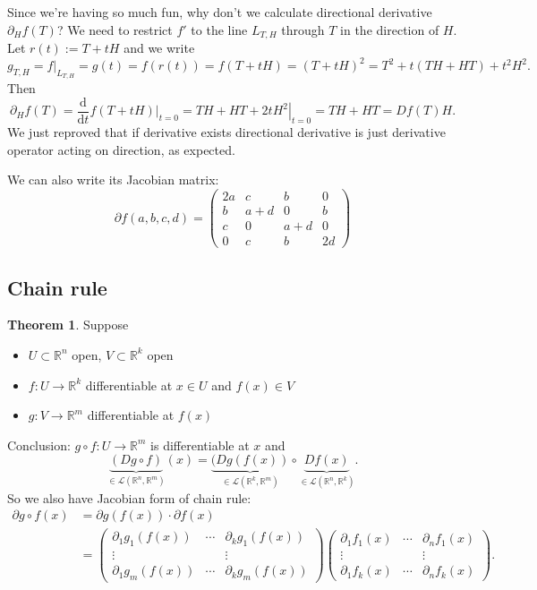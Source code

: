 \documentclass[a4paper]{article}
\theoremstyle{definition}
\newtheorem{thm}[defn]{Theorem}
\begin{document}
Since we're having so much fun, why don't we calculate directional derivative $\partial_H f(T)$? We need to restrict $f'$ to the line $L_{T,H}$ through $T$ in the direction of $H$. Let $r(t):=T+tH$ and we write
\[
g_{T,H} = \left. f \right|_{L_{T,H}} = g(t) = f(r(t)) = f(T+tH) = (T+tH)^2 = T^2+t(TH+HT)+t^2H^2 .
\]
Then
\[
\partial _H f(T) = \frac{\mathrm d}{\mathrm d t} \left. f(T+tH) \right|_{t=0} = \left. TH+HT+2tH^2 \right|_{t=0} = TH+HT = Df(T)H.
\]
We just reproved that if derivative exists directional derivative is just derivative operator acting on direction, as expected.

We can also write its Jacobian matrix:
\[
\partial f (a,b,c,d)=\begin{pmatrix}
2a & c & b & 0\\
b & a+d & 0 & b\\
c & 0 & a+d & 0\\
0 & c & b & 2d
\end{pmatrix}
\]

\subsection{Chain rule}
\begin{thm}
Suppose \begin{itemize}
    \item $U \subset \mathbb R^n$ open, $V\subset \mathbb R^k$ open
    \item $f:U\rightarrow \mathbb R^k$ differentiable at $x\in U$ and $f(x)\in V$
    \item $g:V\rightarrow \mathbb R^m$ differentiable at $f(x)$
\end{itemize}
Conclusion: $g\circ f:U\rightarrow \mathbb R^m$ is differentiable at $x$ and
\[
\underbrace{(D g\circ f)}_{\in \mathcal L(\mathbb R^n, \mathbb R^m)}(x) = \underbrace{(Dg(f(x))}_{\in \mathcal L(\mathbb R^k, \mathbb R^m)} \circ \underbrace{Df(x)}_{\in \mathcal L(\mathbb R^n, \mathbb R^k)} .
\]
So we also have Jacobian form of chain rule:
\[
\begin{aligned}
\partial g\circ f(x) &= \partial g(f(x)) \cdot \partial f(x) \\ &= \begin{pmatrix}
\partial_1 g_1 (f(x)) & \cdots & \partial_k g_1 (f(x)) \\
\vdots & & \vdots \\
\partial_1 g_m (f(x)) & \cdots & \partial_k g_m (f(x)) 
\end{pmatrix}\begin{pmatrix}
\partial_1 f_1(x) & \cdots & \partial_n f_1(x) \\
\vdots & & \vdots \\
\partial_1 f_k(x) & \cdots & \partial_n f_k(x)
\end{pmatrix} .
\end{aligned}
\]
\end{thm}
\end{document}

